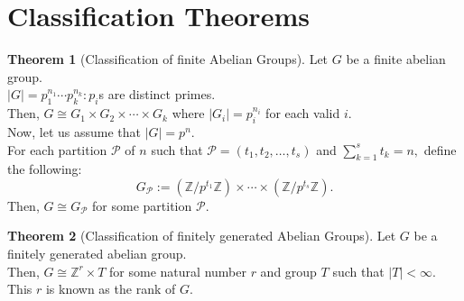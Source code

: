 \documentclass[12 pt, a4paper, toc=graduated, oneside]{article}
\theoremstyle{definition}
\newtheorem{theorem}{Theorem}
\begin{document}
\section{Classification Theorems}
\begin{theorem}[Classification of finite Abelian Groups]
	Let $G$ be a finite abelian group.\\
	$|G| = p_1^{n_1}\cdots p_k^{n_k} : p_i$s are distinct primes.\\
	Then, $G \cong G_1 \times G_2 \times \cdots \times G_k$ where $|G_i| = p_i^{n_i}$ for each valid $i.$\\
	Now, let us assume that $|G| = p^n.$\\
	For each partition $\mathcal{P}$ of $n$ such that $\mathcal{P} = (t_1, t_2, \ldots, t_s)$ and $\displaystyle\sum_{k=1}^{s}t_k = n,$ define the following:
	\[G_{\mathcal{P}} := (\mathbb{Z}/p^{t_1}\mathbb{Z}) \times \cdots \times \left(\mathbb{Z}/p^{t_s}\mathbb{Z}\right).\]
	Then, $G \cong G_\mathcal{P}$ for some partition $\mathcal{P}.$
\end{theorem}
\begin{theorem}[Classification of finitely generated Abelian Groups]
	Let $G$ be a finitely generated abelian group.\\
	Then, $G \cong \mathbb{Z}^r \times T$ for some natural number $r$ and group $T$ such that $|T| < \infty.$ This $r$ is known as the rank of $G.$
\end{theorem}
\end{document}
